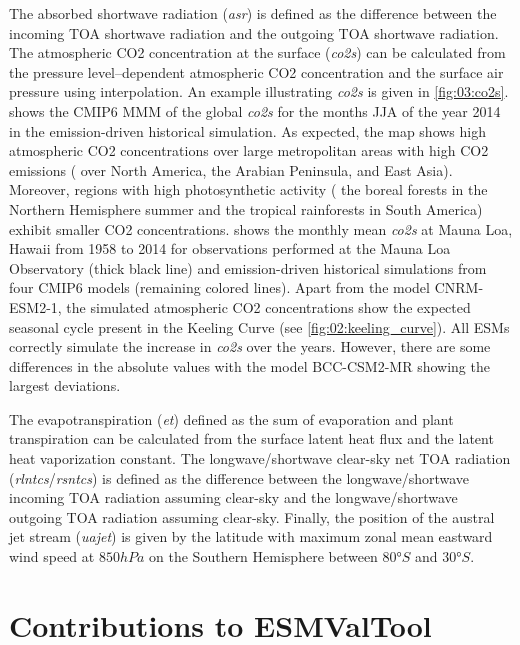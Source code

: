 The absorbed shortwave radiation (\emph{asr}) is defined as the difference
between the incoming \ac{TOA} shortwave radiation and the outgoing \ac{TOA}
shortwave radiation. The atmospheric \ac{CO2} concentration at the surface
(\emph{co2s}) can be calculated from the pressure level--dependent atmospheric
\ac{CO2} concentration and the surface air pressure using interpolation. An
example illustrating \emph{co2s} is given in \cref{fig:03:co2s}.
 shows the \acs{CMIP}6 \ac{MMM} of the global \emph{co2s}
for the months \acf{JJA} of the year 2014 in the emission-driven historical
simulation. As expected, the map shows high atmospheric \ac{CO2} concentrations
over large metropolitan areas with high \ac{CO2} emissions (\eg{} over North
America, the Arabian Peninsula, and East Asia). Moreover, regions with high
photosynthetic activity (\eg{} the boreal forests in the Northern Hemisphere
summer and the tropical rainforests in South America) exhibit smaller \ac{CO2}
concentrations.  shows the monthly mean \emph{co2s} at
Mauna Loa, Hawaii from 1958 to 2014 for observations performed at the Mauna Loa
Observatory \autocite{Keeling2005} (thick black line) and emission-driven
historical simulations from four \acs{CMIP}6 models (remaining colored lines).
Apart from the model CNRM-ESM2-1, the simulated atmospheric \ac{CO2}
concentrations show the expected seasonal cycle present in the Keeling Curve
(see \cref{fig:02:keeling_curve}). All \acp{ESM} correctly simulate the
increase in \emph{co2s} over the years. However, there are some differences in
the absolute values with the model BCC-CSM2-MR showing the largest deviations.

The evapotranspiration (\emph{et}) defined as the sum of evaporation and plant
transpiration can be calculated from the surface latent heat flux and the
latent heat vaporization constant. The longwave/shortwave clear-sky net
\ac{TOA} radiation (\emph{rlntcs}/\emph{rsntcs}) is defined as the difference
between the longwave/shortwave incoming \ac{TOA} radiation assuming clear-sky
and the longwave/shortwave outgoing \ac{TOA} radiation assuming clear-sky.
Finally, the position of the austral jet stream (\emph{uajet}) is given by the
latitude with maximum zonal mean eastward wind speed at $850 \unit{hPa}$ on the
Southern Hemisphere between $80 \unit{\degree S}$ and $30 \unit{\degree S}$.


\section{Contributions to \acs{ESMValTool}}
\label{sec:03:contributions_to_esmvaltool}

